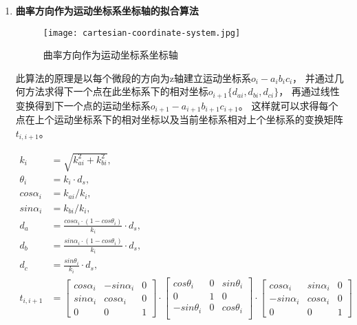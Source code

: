 \begin{enumerate}[label=(\Alph*)]
    \item \textbf{曲率方向作为运动坐标系坐标轴的拟合算法} \\
    \FloatBarrier
    \begin{figure}
    \centering
    \texttt{[image: cartesian-coordinate-system.jpg]}
    \caption{曲率方向作为运动坐标系坐标轴\cite{用于光纤光栅曲线重建算法的坐标点拟合}}
    \end{figure}
    \FloatBarrier

    此算法的原理是以每个微段的方向为z轴建立运动坐标系$o_i-a_ib_ic_i$，
    并通过几何方法求得下一个点在此坐标系下的相对坐标\cite{3d-shape-display}$o_{i+1} \{d_{ai}, d_{bi}, d_{ci}\}$，
    再通过线性变换得到下一个点的运动坐标系\cite{three-dimensional-curve}$o_{i+1}-a_{i+1}b_{i+1} c_{i+1}$。
    这样就可以求得每个点在上个运动坐标系下的相对坐标以及当前坐标系相对上个坐标系的变换矩阵$t_{i, i+1}$。

    \begin{align}
        k_i &= \sqrt{k_{ai} ^ 2 + k_{bi} ^ 2}, \\
        \theta_i &= k_i \cdot d_s, \\
        cos\alpha_i &= k_{ai} / k_i, \\
        sin\alpha_i &= k_{bi} / k_i, \\
        d_a &= \frac{cos\alpha_i \cdot (1 - cos\theta_i)}{k_i} \cdot d_s, \\
        d_b &= \frac{sin\alpha_i \cdot (1 - cos\theta_i)}{k_i} \cdot d_s, \\
        d_c &= \frac{sin\theta_i}{k_i} \cdot d_s, \\
        t_{i, i+1} &= \left[
            \begin{matrix}
                cos \alpha_i & -sin \alpha_i & 0 \\
                sin \alpha_i & cos \alpha_i & 0 \\
                0 & 0 & 1
            \end{matrix}
            \right]
            \cdot
            \left[
            \begin{matrix}
                cos \theta_i & 0 & sin \theta_i \\
                0 & 1 & 0 \\
                -sin \theta_i & 0 & cos \theta_i \\
            \end{matrix}
            \right]
            \cdot
            \left[
            \begin{matrix}
                cos \alpha_i & sin \alpha_i & 0 \\
                -sin \alpha_i & cos \alpha_i & 0 \\
                0 & 0 & 1
            \end{matrix}
            \right] \label{alg:reconstruction}
    \end{align}


\end{enumerate}
